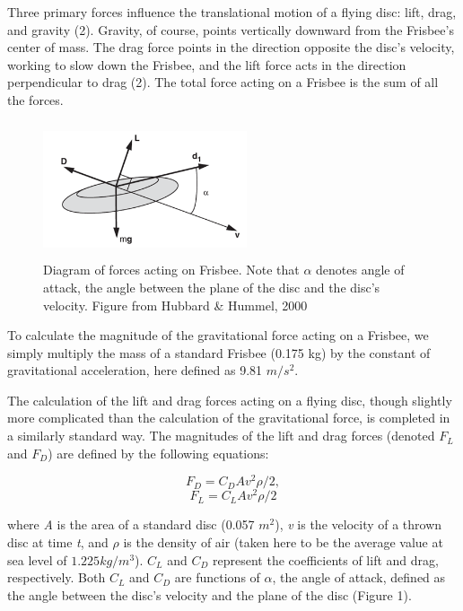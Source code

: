 \documentclass[a4paper,12pt, oneside]{article}
\begin{document}
Three primary forces influence the translational motion of a flying disc: lift, drag, and gravity (2). Gravity, of course, points vertically downward from the Frisbee's center of mass.  The drag force points in the direction opposite the disc's velocity, working to slow down the Frisbee, and the lift force acts in the direction perpendicular to drag (2). The total force acting on a Frisbee is the sum of all the forces.
\begin{figure}[h]
        \includegraphics[width=6cm, height=4cm]{frisforces}
	\centering
	\caption{Diagram of forces acting on Frisbee. Note that $\alpha$ denotes angle of attack, the angle between the plane of the disc and the disc's velocity. Figure from Hubbard \& Hummel, 2000}
\end{figure}

To calculate the magnitude of the gravitational force acting on a Frisbee, we simply multiply the mass of a standard Frisbee (0.175 kg) by the constant of gravitational acceleration, here defined as  9.81 $m/s^{2}.$ 
 
The calculation of the lift and drag forces acting on a flying disc, though slightly more complicated than the calculation of the gravitational force, is completed in a similarly standard way. The magnitudes of the lift and drag forces (denoted $F_L$ and $F_D$) are defined by the following equations:

\begin{equation}
  F_D=C_DAv^2\rho/2,
\end{equation}
\begin{equation}
  F_L=C_LAv^2\rho/2
\end{equation}

where \textit{A} is the area of a standard disc (0.057 $m^2$), \textit{v} is the velocity of a thrown disc at time \textit{t}, and $\rho$ is the density of air (taken here to be the average value at sea level of $1.225 kg/m^3$). $C_L$ and $C_D$ represent the coefficients of lift and drag, respectively. Both $C_L$ and $C_D$ are functions of $\alpha$, the angle of attack, defined as the angle between the disc's velocity and the plane of the disc (Figure 1). 
\end{document}

